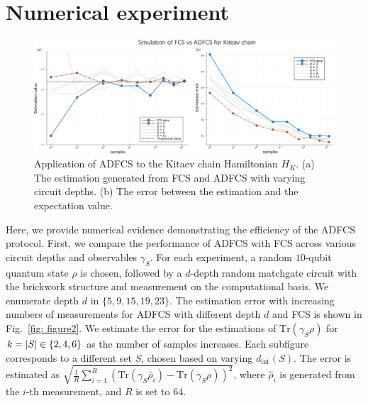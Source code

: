 \documentclass[showpacs,onecolumn,aps,prx,long bibliography,superscriptaddress,notitlepage]{revtex4-1}
\newcommand{\cbra}[1]{\{ #1 \}}
\newcommand{\tra}[1]{\text{Tr}\left( #1 \right)}
\begin{document}
\section{Numerical experiment}

\begin{figure}
    \centering
    \includegraphics[width=\linewidth]{figures/main/figure3_v6.pdf}
    \caption{\centering
Application of ADFCS to the Kitaev chain Hamiltonian $H_K$. 
(a) The estimation generated from FCS and ADFCS with varying circuit depths.
(b) The error between the estimation and the expectation value. 
}
    \label{fig: figure3}
\end{figure}


Here, we provide numerical evidence demonstrating the efficiency of the ADFCS protocol. First, we compare the performance of ADFCS with FCS across various circuit depths and observables $\gamma_S$. For each experiment, a random $10$-qubit quantum state $\rho$ is chosen, followed by a $d$-depth random matchgate circuit with the brickwork structure and measurement on the computational basis. We enumerate depth $d$ in $\cbra{5,9,15,19,23}$. The estimation error with increasing numbers of measurements for ADFCS with different depth $d$ and FCS is shown in Fig.~\ref{fig: figure2}.
We estimate the error for the estimations of $\tra{\gamma_S \rho}$ for $k=\abs{S} \in\cbra{2,4,6}$ as the number of samples increases. Each subfigure corresponds to a different set $S$, chosen based on varying $d_\text{int}(S)$.
 The error is estimated as $\sqrt{\frac{1}{R}\sum_{i = 1}^R (\tra{\gamma_S\hat{\rho}_i} - \tra{\gamma_S\rho})^2} $, where $\hat{\rho}_i$ is generated from the $i$-th measurement, and $R$ is set to $64$. 
\end{document}
